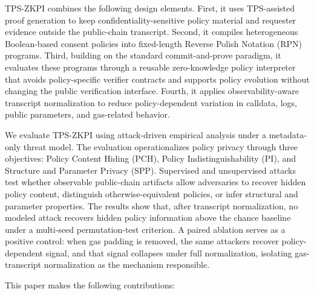 TPS-ZKPI combines the following design elements.
First, it uses TPS-assisted proof generation to keep confidentiality-sensitive policy material and requester evidence outside the public-chain transcript.
Second, it compiles heterogeneous Boolean-based consent policies into fixed-length Reverse Polish Notation (RPN) programs.
Third, building on the standard commit-and-prove paradigm, it evaluates these programs through a reusable zero-knowledge policy interpreter that avoids policy-specific verifier contracts and supports policy evolution without changing the public verification interface.
Fourth, it applies observability-aware transcript normalization to reduce policy-dependent variation in calldata, logs, public parameters, and gas-related behavior.

We evaluate TPS-ZKPI using attack-driven empirical analysis under a metadata-only threat model.
The evaluation operationalizes policy privacy through three objectives: Policy Content Hiding (PCH), Policy Indistinguishability (PI), and Structure and Parameter Privacy (SPP).
Supervised and unsupervised attacks test whether observable public-chain artifacts allow adversaries to recover hidden policy content, distinguish otherwise-equivalent policies, or infer structural and parameter properties.
The results show that, after transcript normalization, no modeled attack recovers hidden policy information above the chance baseline under a multi-seed permutation-test criterion.
A paired ablation serves as a positive control: when gas padding is removed, the same attackers recover policy-dependent signal, and that signal collapses under full normalization, isolating gas-transcript normalization as the mechanism responsible.

This paper makes the following contributions:


